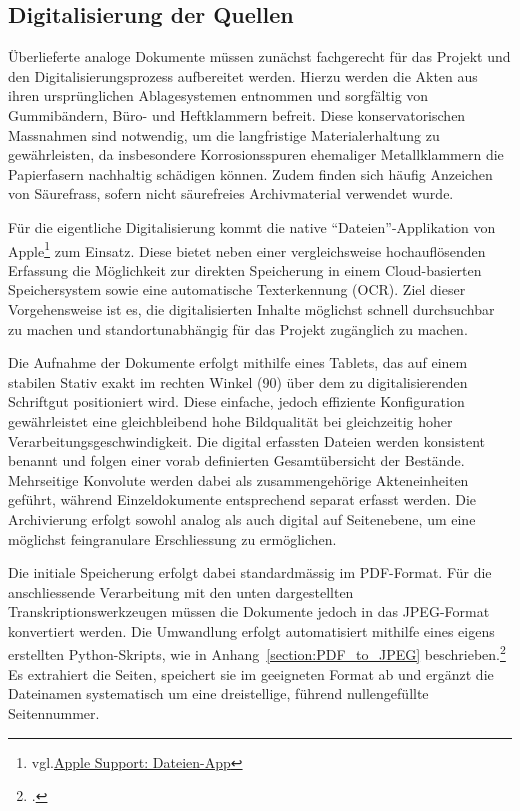 \documentclass[12pt, a4paper, ngerman, bidi=default]{article}
\let\cite\footcite
\begin{document}
\subsection{Digitalisierung der Quellen}

Überlieferte analoge Dokumente müssen zunächst fachgerecht für das Projekt und den Digitalisierungsprozess aufbereitet werden. 
Hierzu werden die Akten aus ihren ursprünglichen Ablagesystemen entnommen und sorgfältig von Gummibändern, Büro- und Heftklammern 
befreit. Diese konservatorischen Massnahmen sind notwendig, um die langfristige Materialerhaltung zu gewährleisten, 
da insbesondere Korrosionsspuren ehemaliger Metallklammern die Papierfasern nachhaltig schädigen können. Zudem finden sich häufig 
Anzeichen von Säurefrass, sofern nicht säurefreies Archivmaterial verwendet wurde.

Für die eigentliche Digitalisierung kommt die native \enquote{Dateien}-Applikation von 
Apple\footnote{vgl.\href{https://support.apple.com/de-de/guide/preview/prvw28034/mac}{Apple Support: Dateien-App}} zum Einsatz. 
Diese bietet neben einer vergleichsweise hochauflösenden Erfassung die Möglichkeit zur direkten Speicherung in einem Cloud-basierten 
Speichersystem sowie eine automatische Texterkennung (OCR). Ziel dieser Vorgehensweise ist es, die digitalisierten Inhalte möglichst 
schnell durchsuchbar zu machen und standortunabhängig für das Projekt zugänglich zu machen.

Die Aufnahme der Dokumente erfolgt mithilfe eines Tablets, das auf einem stabilen Stativ exakt im rechten Winkel (90\textdegree)
über dem zu digitalisierenden Schriftgut positioniert wird. Diese einfache, jedoch effiziente Konfiguration gewährleistet eine 
gleichbleibend hohe Bildqualität bei gleichzeitig hoher Verarbeitungsgeschwindigkeit. Die digital erfassten Dateien werden konsistent
 benannt und folgen einer vorab definierten Gesamtübersicht der Bestände. Mehrseitige Konvolute werden dabei als zusammengehörige 
 Akteneinheiten geführt, während Einzeldokumente entsprechend separat erfasst werden. Die Archivierung erfolgt sowohl analog als auch 
 digital auf Seitenebene, um eine möglichst feingranulare Erschliessung zu ermöglichen.

Die initiale Speicherung erfolgt dabei standardmässig im PDF-Format. Für die anschliessende Verarbeitung mit den unten dargestellten 
Transkriptionswerkzeugen müssen die Dokumente jedoch in das JPEG-Format konvertiert werden. Die Umwandlung erfolgt automatisiert 
mithilfe eines eigens erstellten Python-Skripts, wie in Anhang~\ref{section:PDF_to_JPEG} beschrieben.\cite{burkhardt_githubpdf_to_jpegpy_2025}
Es extrahiert die Seiten, speichert sie im geeigneten 
Format ab und ergänzt die Dateinamen systematisch um eine dreistellige, führend nullengefüllte Seitennummer.
\end{document}
